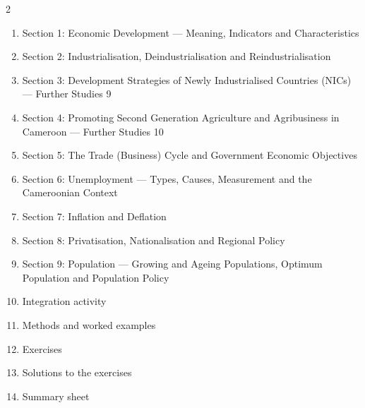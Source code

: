 \documentclass[11pt]{article}
\begin{document}
\begin{sommaire}
\begin{multicols}{2}
\begin{enumerate}
\item Section 1: Economic Development — Meaning, Indicators and Characteristics
\item Section 2: Industrialisation, Deindustrialisation and Reindustrialisation
\item Section 3: Development Strategies of Newly Industrialised Countries (NICs) — Further Studies 9
\item Section 4: Promoting Second Generation Agriculture and Agribusiness in Cameroon — Further Studies 10
\item Section 5: The Trade (Business) Cycle and Government Economic Objectives
\item Section 6: Unemployment — Types, Causes, Measurement and the Cameroonian Context
\item Section 7: Inflation and Deflation
\item Section 8: Privatisation, Nationalisation and Regional Policy
\item Section 9: Population — Growing and Ageing Populations, Optimum Population and Population Policy
\item Integration activity
\item Methods and worked examples
\item Exercises
\item Solutions to the exercises
\item Summary sheet
\end{enumerate}
\end{multicols}
\end{sommaire}
\end{document}
